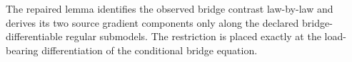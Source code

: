 The repaired lemma identifies the observed bridge contrast law-by-law and derives its two source gradient components only along the declared bridge-differentiable regular submodels.  The restriction is placed exactly at the load-bearing differentiation of the conditional bridge equation.